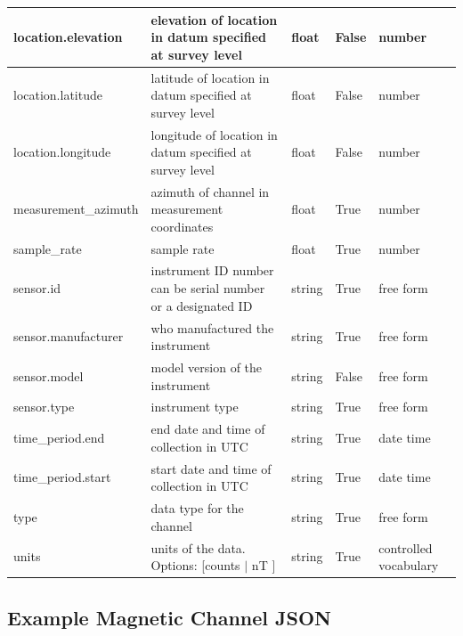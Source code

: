 \documentclass[12pt]{article}
\begin{document}
\begin{table}[h!]
\begin{tabular}{|l|p{2.75in}|l|l|p{.95in}|}
	location.elevation & elevation of location in datum specified at survey level & float & False & number  \\ \hline
	location.latitude & latitude of location in datum specified at survey level & float & False & number  \\ \hline
	location.longitude & longitude of location in datum specified at survey level & float & False & number  \\ \hline
	measurement\_azimuth & azimuth of channel in measurement coordinates & float & True & number  \\ \hline
	sample\_rate & sample rate & float & True & number  \\ \hline
	sensor.id & instrument ID number can be serial number or a designated ID & string & True & free form  \\ \hline
	sensor.manufacturer & who manufactured the instrument & string & True & free form  \\ \hline
	sensor.model & model version of the instrument & string & False & free form  \\ \hline
	sensor.type & instrument type & string & True & free form  \\ \hline
	time\_period.end & end date and time of collection in UTC & string & True & date time  \\ \hline
	time\_period.start & start date and time of collection in UTC & string & True & date time  \\ \hline
	type & data type for the channel & string & True & free form  \\ \hline
	units & units of the data. Options: [counts $|$ nT ] & string & True & controlled vocabulary  \\ \hline
        \end{tabular}
    \label{tab:magnetic}
\end{table}

\newpage
\subsection{Example Magnetic Channel JSON}
\end{document}
